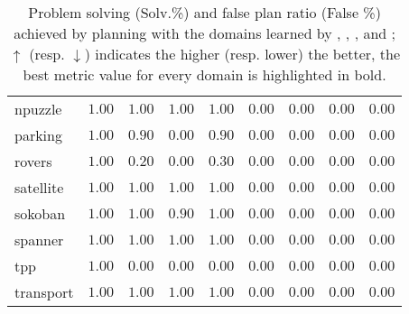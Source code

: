 \begin{table}[h]
{\begin{tabular}{l|cccc|cccc|}
npuzzle & $\mathbf{1.00}$ & $\mathbf{1.00}$ & $\mathbf{1.00}$ & $\mathbf{1.00}$ & $\mathbf{0.00}$ & $\mathbf{0.00}$ & $\mathbf{0.00}$ & $\mathbf{0.00}$ \\
parking & $\mathbf{1.00}$ & $0.90$ & $0.00$ & $0.90$ & $\mathbf{0.00}$ & $\mathbf{0.00}$ & $\mathbf{0.00}$ & $\mathbf{0.00}$ \\
rovers & $\mathbf{1.00}$ & $0.20$ & $0.00$ & $0.30$ & $\mathbf{0.00}$ & $\mathbf{0.00}$ & $\mathbf{0.00}$ & $\mathbf{0.00}$ \\
satellite & $\mathbf{1.00}$ & $\mathbf{1.00}$ & $\mathbf{1.00}$ & $\mathbf{1.00}$ & $\mathbf{0.00}$ & $\mathbf{0.00}$ & $\mathbf{0.00}$ & $\mathbf{0.00}$ \\
sokoban & $\mathbf{1.00}$ & $\mathbf{1.00}$ & $0.90$ & $\mathbf{1.00}$ & $\mathbf{0.00}$ & $\mathbf{0.00}$ & $\mathbf{0.00}$ & $\mathbf{0.00}$ \\
spanner & $\mathbf{1.00}$ & $\mathbf{1.00}$ & $\mathbf{1.00}$ & $\mathbf{1.00}$ & $\mathbf{0.00}$ & $\mathbf{0.00}$ & $\mathbf{0.00}$ & $\mathbf{0.00}$ \\
tpp & $\mathbf{1.00}$ & $0.00$ & $0.00$ & $0.00$ & $\mathbf{0.00}$ & $\mathbf{0.00}$ & $\mathbf{0.00}$ & $\mathbf{0.00}$ \\
transport & $\mathbf{1.00}$ & $\mathbf{1.00}$ & $\mathbf{1.00}$ & $\mathbf{1.00}$ & $\mathbf{0.00}$ & $\mathbf{0.00}$ & $\mathbf{0.00}$ & $\mathbf{0.00}$ \\
\hline
\end{tabular}
}
\caption{Problem solving (Solv.\%) and false plan ratio (False \%) achieved by planning with the domains learned by \offlam, \sam, \rosame, and \nolam; $\uparrow$ (resp. $\downarrow$) indicates the higher (resp. lower) the better, the best metric value for every domain is highlighted in bold.}
\label{tab:solving_ratio_false_plans_ratio}
\end{table}
